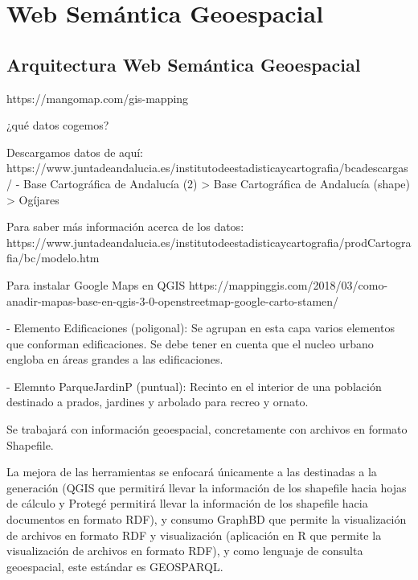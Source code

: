 \section{Web Semántica Geoespacial}


\subsection{Arquitectura Web Semántica Geoespacial}



% 

https://mangomap.com/gis-mapping


¿qué datos cogemos?

Descargamos datos de aquí: https://www.juntadeandalucia.es/institutodeestadisticaycartografia/bcadescargas/
- Base Cartográfica de Andalucía (2) > Base Cartográfica de Andalucía (shape) > Ogíjares

Para saber más información acerca de los datos: https://www.juntadeandalucia.es/institutodeestadisticaycartografia/prodCartografia/bc/modelo.htm

Para instalar Google Maps en QGIS
https://mappinggis.com/2018/03/como-anadir-mapas-base-en-qgis-3-0-openstreetmap-google-carto-stamen/


- Elemento Edificaciones (poligonal): Se agrupan en esta capa varios elementos que conforman edificaciones. Se debe tener en cuenta que el nucleo urbano engloba en áreas grandes a las edificaciones.

- Elemnto ParqueJardinP (puntual): Recinto en el interior de una población destinado a prados, jardines y arbolado
para recreo y ornato. 


Se trabajará con información  geoespacial, concretamente con archivos en formato Shapefile. 

La mejora de las herramientas se enfocará únicamente a las destinadas a la generación (QGIS que permitirá llevar la información  de los shapefile hacia hojas de cálculo y Protegé permitirá llevar la información  de los shapefile hacia documentos en formato RDF), y consumo GraphBD que permite la visualización de archivos en formato RDF y visualización (aplicación en R que permite la visualización de archivos en formato RDF),  y como lenguaje de consulta geoespacial, este estándar es GEOSPARQL.

